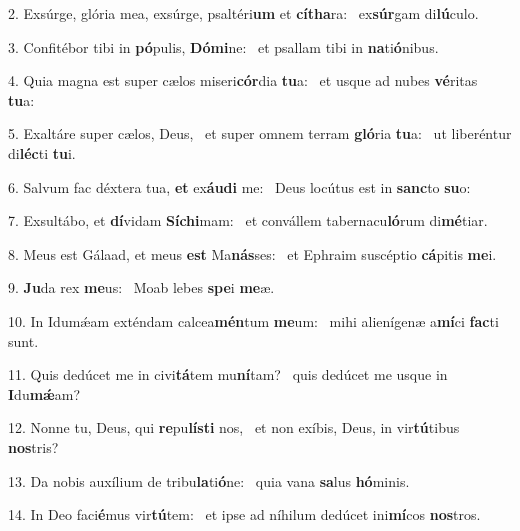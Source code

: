2. Exsúrge, glória mea, exsúrge, psaltéri\textbf{um} et \textbf{cí}\textbf{tha}ra: \ast\  ex\textbf{súr}gam di\textbf{lú}culo.\

3. Confitébor tibi in \textbf{pó}pulis, \textbf{Dó}\textbf{mi}ne: \ast\  et psallam tibi in \textbf{na}ti\textbf{ó}nibus.\

4. Quia magna est super cælos miseri\textbf{cór}dia \textbf{tu}a: \ast\  et usque ad nubes \textbf{vé}ritas \textbf{tu}a:\

5. Exaltáre super cælos, Deus, \dag\  et super omnem terram \textbf{gló}ria \textbf{tu}a: \ast\  ut liberéntur di\textbf{léc}ti \textbf{tu}i.\

6. Salvum fac déxtera tua, \textbf{et} ex\textbf{áu}\textbf{di} me: \ast\  Deus locútus est in \textbf{sanc}to \textbf{su}o:\

7. Exsultábo, et \textbf{dí}vidam \textbf{Sí}\textbf{chi}mam: \ast\  et convállem tabernacu\textbf{ló}rum di\textbf{mé}tiar.\

8. Meus est Gálaad, et meus \textbf{est} Ma\textbf{nás}ses: \ast\  et Ephraim suscéptio \textbf{cá}pitis \textbf{me}i.\

9. \textbf{Ju}da rex \textbf{me}us: \ast\  Moab lebes \textbf{spe}i \textbf{me}æ.\

10. In Idumǽam exténdam calcea\textbf{mén}tum \textbf{me}um: \ast\  mihi alienígenæ a\textbf{mí}ci \textbf{fac}ti sunt.\

11. Quis dedúcet me in civi\textbf{tá}tem mu\textbf{ní}tam? \ast\  quis dedúcet me usque in \textbf{I}du\textbf{mǽ}am?\

12. Nonne tu, Deus, qui \textbf{re}pu\textbf{lís}\textbf{ti} nos, \ast\  et non exíbis, Deus, in vir\textbf{tú}tibus \textbf{nos}tris?\

13. Da nobis auxílium de tribu\textbf{la}ti\textbf{ó}ne: \ast\  quia vana \textbf{sa}lus \textbf{hó}minis.\

14. In Deo faci\textbf{é}mus vir\textbf{tú}tem: \ast\  et ipse ad níhilum dedúcet ini\textbf{mí}cos \textbf{nos}tros.\

